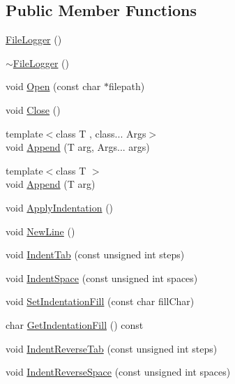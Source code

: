 \subsection*{Public Member Functions}
\begin{DoxyCompactItemize}
\item 
\mbox{\hyperlink{classutl_1_1_file_logger_af863c2a6176181b6c252ff91a46760fa}{File\+Logger}} ()
\item 
\mbox{\hyperlink{classutl_1_1_file_logger_a2bbc4a7a41145e14efaafb9563a8a869}{$\sim$\+File\+Logger}} ()
\item 
void \mbox{\hyperlink{classutl_1_1_file_logger_affe578f56cb67c168db89edf6b93497f}{Open}} (const char $\ast$filepath)
\item 
void \mbox{\hyperlink{classutl_1_1_file_logger_a1df768e7a0615fdbb6bf8d3a9b459c75}{Close}} ()
\item 
{\footnotesize template$<$class T , class... Args$>$ }\\void \mbox{\hyperlink{classutl_1_1_file_logger_aafcfaedf7477ef92fa0bfc9153b06fdb}{Append}} (T arg, Args... args)
\item 
{\footnotesize template$<$class T $>$ }\\void \mbox{\hyperlink{classutl_1_1_file_logger_a04df8807b424079163a1f6780ea339ef}{Append}} (T arg)
\item 
void \mbox{\hyperlink{classutl_1_1_file_logger_a27f64e20da2b923600fd3fda9b1ebf44}{Apply\+Indentation}} ()
\item 
void \mbox{\hyperlink{classutl_1_1_file_logger_ae4a25d385148ae2ebb310e779a23c4aa}{New\+Line}} ()
\item 
void \mbox{\hyperlink{classutl_1_1_file_logger_a286c8ae460735757b7948cf99d418ed5}{Indent\+Tab}} (const unsigned int steps)
\item 
void \mbox{\hyperlink{classutl_1_1_file_logger_ab714a77af672c562512044198be30885}{Indent\+Space}} (const unsigned int spaces)
\item 
void \mbox{\hyperlink{classutl_1_1_file_logger_aec7cd859010754605ecbcded93815eca}{Set\+Indentation\+Fill}} (const char fill\+Char)
\item 
char \mbox{\hyperlink{classutl_1_1_file_logger_a1352f5759c245eec3650271dd7b10459}{Get\+Indentation\+Fill}} () const
\item 
void \mbox{\hyperlink{classutl_1_1_file_logger_a8ee37650826800cf02719c2e67d1bc16}{Indent\+Reverse\+Tab}} (const unsigned int steps)
\item 
void \mbox{\hyperlink{classutl_1_1_file_logger_aae921d2a4b24dd2639575208f101ac4a}{Indent\+Reverse\+Space}} (const unsigned int spaces)

\end{DoxyCompactItemize}
